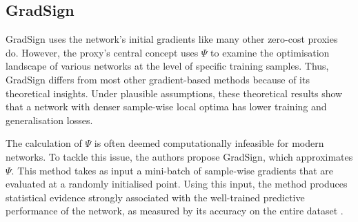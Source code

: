 \subsection{GradSign}
GradSign uses the network's initial gradients like many other zero-cost proxies do. However, the proxy's central concept uses $\Psi$ to examine the optimisation landscape of various networks at the level of specific training samples. Thus, GradSign differs from most other gradient-based methods because of its theoretical insights. Under plausible assumptions, these theoretical results show that a network with denser sample-wise local optima has lower training and generalisation losses.

The calculation of $\Psi$ is often deemed computationally infeasible for modern networks. To tackle this issue, the authors propose GradSign, which approximates $\Psi$. This method takes as input a mini-batch of sample-wise gradients that are evaluated at a randomly initialised point. Using this input, the method produces statistical evidence strongly associated with the well-trained predictive performance of the network, as measured by its accuracy on the entire dataset \autocite{zhang2021gradsign}. 

